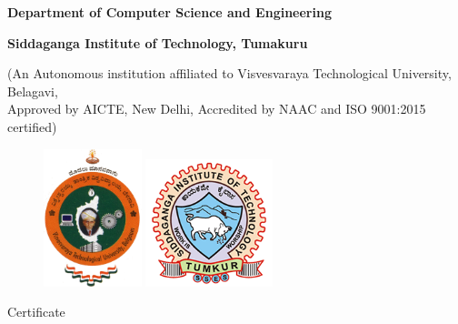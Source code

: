 \thispagestyle{empty}

\setlength{\toptafiddle}{1in}
\setlength{\bottafiddle}{1in}

\vspace*{-0.75in}
\enlargethispage{\toptafiddle}

\begin{center}

\begin{Large}
\textbf{Department of Computer Science and Engineering} \\
\end{Large}

\begin{Large}
\textbf{Siddaganga Institute of Technology, Tumakuru}\\
\end{Large}

\begin{small}

(An Autonomous institution affiliated to Visvesvaraya Technological University, Belagavi,\\ Approved by AICTE, New Delhi, Accredited by NAAC and ISO 9001:2015 certified)
\end{small}

\begin{figure}[h]
    \centering
    \includegraphics[height=4cm]{images/vtu.png}
    \hspace{0.1\textwidth}
    \includegraphics[height=3.7cm]{images/sit.png}
\end{figure}

\Huge{Certificate}
\end{center}

